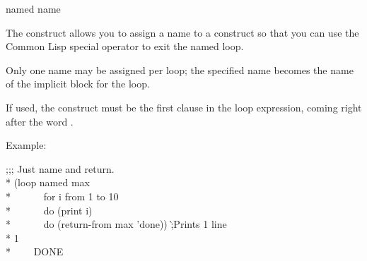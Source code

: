 \begin{defloop}
named name

The  construct allows you to assign a name to a 
construct so that you can use the Common Lisp special operator 
 to exit the named loop.

Only one name may be assigned per loop; the specified name becomes the
name of the implicit block for the loop.

If used, the 
construct must be the first clause in the loop expression, coming right after the
word .

Example:
\begin{lisp}
;;; Just name and return. \\*
(loop named max \\*
~~~~~~for i from 1 to 10 \\*
~~~~~~do (print i) \\*
~~~~~~do (return-from max 'done)) \`;\textrm{Prints 1 line}\\*
1  \\*
~~~\EV~DONE
\end{lisp}
\end{defloop}

